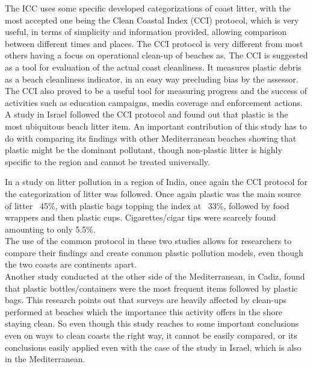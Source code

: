 \documentclass[10pt]{article}\usepackage[]{graphicx}\usepackage[]{color}
\begin{document}
The ICC uses some specific developed categorizations of coast litter, with the most accepted one being the Clean Coastal Index (CCI) protocol, which is very useful, in terms of simplicity and information provided, allowing comparison between different times and places. The CCI protocol is very different from most others having a focus on operational clean-up of beaches as. The CCI is suggested as a tool for evaluation of the actual coast cleanliness. It measures plastic debris as a beach cleanliness indicator, in an easy way precluding bias by the assessor. The CCI also proved to be a useful tool for measuring progress and the success of activities such as education campaigns, media coverage and enforcement actions. \cite{ALKALAY2007} \\

A study in Israel followed the CCI protocol and found out that plastic is the most ubiquitous beach litter item.  An important contribution of this study has to do with comparing its findings with other Mediterranean beaches showing that plastic might be the dominant pollutant, though non-plastic litter is highly specific to the region and cannot be treated universally. \cite{PORTMAN2017}

In a study on litter pollution in a region of India, once again the CCI protocol for the categorization of litter was followed. Once again plastic was the main source of litter ~45\%, with plastic bags topping the index at ~33\%, followed by food wrappers and then plastic cups. Cigarettes/cigar tips were scarcely found amounting to only 5.5\%. \cite{KUMAR2016} \\

The use of the common protocol in these two studies allows for researchers to compare their findings and create common plastic pollution models, even though the two coasts are continents apart. \\

Another study conducted at the other side of the Mediterranean, in Cadiz, found that plastic bottles/containers were the most frequent items followed by plastic bags. This research points out that surveys are heavily affected by clean-ups performed at beaches which the importance this activity offers in the shore staying clean.  \cite{WILLIAMS2016} So even though this study reaches to some important conclusions even on ways to clean coasts the right way, it cannot be easily compared, or its conclusions easily applied even with the case of the study in Israel, which is also in the Mediterranean.\\
\end{document}
